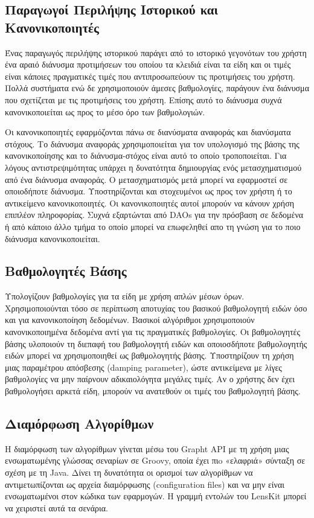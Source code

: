 \subsection{Παραγωγοί Περιλήψης Ιστορικού και Κανονικοποιητές}
Ένας παραγωγός περιλήψης ιστορικού παράγει από το ιστορικό γεγονότων του χρήστη ένα αραιό διάνυσμα προτιμήσεων του οποίου τα κλειδιά είναι τα είδη και οι τιμές είναι κάποιες πραγματικές τιμές που αντιπροσωπεύουν τις προτιμήσεις του χρήστη. Πολλά συστήματα ενώ δε χρησιμοποιούν άμεσες βαθμολογίες, παράγουν ένα διάνυσμα που σχετίζεται με τις προτιμήσεις του χρήστη. Επίσης αυτό το διάνυσμα συχνά κανονικοποιείται ως προς το μέσο όρο των βαθμολογιών. \par
Οι κανονικοποιητές εφαρμόζονται πάνω σε διανύσματα αναφοράς και διανύσματα στόχους. Το διάνυσμα αναφοράς χρησιμοποιείται για τον υπολογισμό της βάσης της κανονικοποίησης και το διάνυσμα-στόχος είναι αυτό το οποίο τροποποιείται. Για λόγους αντιστρεψιμότητας υπάρχει η δυνατότητα δημιουργίας ενός μετασχηματισμού από ένα διάνυσμα αναφοράς. Ο μετασχηματισμός μετά μπορεί να εφαρμοστεί σε οποιοδήποτε διάνυσμα. Υποστηρίζονται και στοχευμένοι ως προς τον χρήστη ή το αντικείμενο κανονικοποιητές. Οι κανονικοποιητές αυτοί μπορούν να κάνουν χρήση επιπλέον πληροφορίας. Συχνά εξαρτώνται από \en DAOs \el για την πρόσβαση σε δεδομένα ή από κάποιο άλλο τμήμα το οποίο μπορεί να επωφεληθεί απο τη γνώση για το ποιο διάνυσμα κανονικοποιείται.
\subsection{Βαθμολογητές Βάσης}
Υπολογίζουν βαθμολογίες για τα είδη με χρήση απλών μέσων όρων. Χρησιμοποιούνται τόσο σε περίπτωση αποτυχίας του βασικού βαθμολογητή ειδών όσο και για κανονικοποίηση δεδομένων. Βασικοί αλγόριθμοι χρησιμοποιούν κανονικοποιημένα δεδομένα αντί για τις πραγματικές βαθμολογίες. Οι βαθμολογητές βάσης υλοποιούν τη διεπαφή του βαθμολογητή ειδών και οποιοσδήποτε βαθμολογητής ειδών μπορεί να χρησιμοποιηθεί ως βαθμολογητής βάσης. Υποστηρίζουν τη χρήση μιας παραμέτρου απόσβεσης (\en damping parameter)\el, ώστε αντικείμενα με λίγες βαθμολογίες να μην παίρνουν αδικαιολόγητα μεγάλες τιμές. Αν ο χρήστης δεν έχει βαθμολογήσει αρκετά είδη, μπορούν να ανατεθούν οι τιμές του βαθμολογητή βάσης.
\subsection{Διαμόρφωση Αλγορίθμων}
Η διαμόρφωση των αλγορίθμων γίνεται μέσω του \en Grapht API \el με τη χρήση μιας ενσωματωμένης γλώσσας σεναρίων σε \en Groovy,  οποία έχει πιo «ελαφριά» σύνταξη σε σχέση με τη \en Java. \el Δίνει τη δυνατότητα οι ορισμοί των αλγορίθμων να αντιμετωπίζονται ως αρχεία διαμόρφωσης ({\en configuration files}) και να μην είναι ενσωματωμένοι στον κώδικα των εφαρμογών. Η γραμμή εντολών του \en LensKit \el μπορεί να χειριστεί αυτά τα σενάρια.
